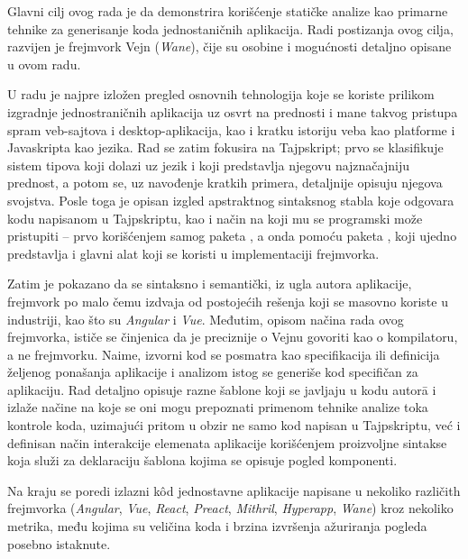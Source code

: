 Glavni cilj ovog rada je da demonstrira korišćenje statičke analize kao primarne tehnike za generisanje koda jednostaničnih aplikacija.
Radi postizanja ovog cilja, razvijen je frejmvork Vejn (\textsl{Wane}), čije su osobine i mogućnosti detaljno opisane u ovom radu.

U radu je najpre izložen pregled osnovnih tehnologija koje se koriste prilikom izgradnje jednostraničnih aplikacija uz osvrt na prednosti i mane takvog pristupa spram veb-sajtova i desktop-aplikacija, kao i kratku istoriju veba kao platforme i Javaskripta kao jezika.
Rad se zatim fokusira na Tajpskript; prvo se klasifikuje sistem tipova koji dolazi uz jezik i koji predstavlja njegovu najznačajniju prednost, a potom se, uz navođenje kratkih primera, detaljnije opisuju njegova svojstva.
Posle toga je opisan izgled apstraktnog sintaksnog stabla koje odgovara kodu napisanom u Tajpskriptu, kao i način na koji mu se programski može pristupiti -- prvo korišćenjem samog paketa , a onda pomoću paketa , koji ujedno predstavlja i glavni alat koji se koristi u implementaciji frejmvorka.

Zatim je pokazano da se sintaksno i semantički, iz ugla autora aplikacije, frejmvork po malo čemu izdvaja od postojećih rešenja koji se masovno koriste u industriji, kao što su \textsl{Angular} i \textsl{Vue}.
Međutim, opisom načina rada ovog frejmvorka, ističe se činjenica da je preciznije o Vejnu govoriti kao o kompilatoru, a ne frejmvorku.
Naime, izvorni kod se posmatra kao specifikacija ili definicija željenog ponašanja aplikacije i analizom istog se generiše kod specifičan za aplikaciju.
Rad detaljno opisuje razne šablone koji se javljaju u kodu autor\=a i izlaže načine na koje se oni mogu prepoznati primenom tehnike analize toka kontrole koda, uzimajući pritom u obzir ne samo kod napisan u Tajpskriptu, već i definisan način interakcije elemenata aplikacije korišćenjem proizvoljne sintakse koja služi za deklaraciju šablona kojima se opisuje pogled komponenti.

Na kraju se poredi izlazni kôd jednostavne  aplikacije napisane u nekoliko različith frejmvorka (\textsl{Angular}, \textsl{Vue}, \textsl{React}, \textsl{Preact}, \textsl{Mithril}, \textsl{Hyperapp}, \textsl{Wane}) kroz nekoliko metrika, među kojima su veličina koda i brzina izvršenja ažuriranja pogleda posebno istaknute.

